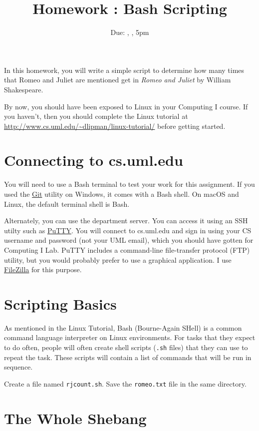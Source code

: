 \documentclass[12pt]{article}
\title{Homework \hwno: Bash Scripting}
\date{Due: \dayofweekname{\duedate}{\duemonth}{\year}, \monthname[\duemonth] \duedate, 5pm}
\newcommand{\code}[1]{\texttt{#1}}
\newcommand{\filename}{\code{rjcount.sh}\xspace}
\begin{document}
\maketitle

In this homework, you will write a simple script to determine how many times that Romeo and Juliet are mentioned get in \emph{Romeo and Juliet} by William Shakespeare.

By now, you should have been exposed to Linux in your Computing I course.  If you haven't, then you should complete the Linux tutorial at \url{http://www.cs.uml.edu/~dlipman/linux-tutorial/} before getting started.

\section*{Connecting to cs.uml.edu}
You will need to use a Bash terminal to test your work for this assignment.
If you used the \href{https://git-scm.com/}{Git} utility on Windows, it comes with a Bash shell.
On macOS and Linux, the default terminal shell is Bash.

Alternately, you can use the department server.
You can access it using an SSH utilty such as \href{https://www.chiark.greenend.org.uk/~sgtatham/putty/latest.html}{PuTTY}.
You will connect to cs.uml.edu and sign in using your CS username and password (not your UML email), which you should have gotten for Computing I Lab.
PuTTY includes a command-line file-transfer protocol (FTP) utility, but you would probably prefer to use a graphical application.
I use \href{https://filezilla-project.org/}{FileZilla} for this purpose.


\section*{Scripting Basics}
As mentioned in the Linux Tutorial, Bash (Bourne-Again SHell) is a common command language interpreter on Linux environments.
For tasks that they expect to do often, people will often create shell scripts (\code{.sh} files) that they can use to repeat the task.
These scripts will contain a list of commands that will be run in sequence.

Create a file named \filename.  Save the \code{romeo.txt} file in the same directory.

\section*{The Whole Shebang}
\end{document}
